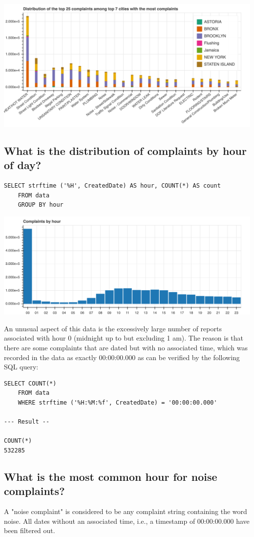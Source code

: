 \documentclass[12pt,a4paper]{article}
\begin{document}
\includegraphics[scale=0.3]{topcomplaintsfortop7cities}

\subsection{What is the distribution of complaints by hour of day?}
\begin{verbatim}
SELECT strftime ('%H', CreatedDate) AS hour, COUNT(*) AS count
    FROM data
    GROUP BY hour
\end{verbatim}

\includegraphics[scale=0.3]{complaintsbyhour}


An unusual aspect of this data is the excessively large number of reports associated with hour 0 (midnight up to but excluding 1 am). The reason is that there are some complaints that are dated but with no associated time, which was recorded in the data as exactly 00:00:00.000 as can be verified by the following SQL query:

\begin{verbatim}
SELECT COUNT(*)
    FROM data
    WHERE strftime ('%H:%M:%f', CreatedDate) = '00:00:00.000'

--- Result --

COUNT(*)
532285
\end{verbatim}


\subsection{What is the most common hour for noise complaints?}
A "noise complaint" is considered to be any complaint string containing the word noise. All dates without an associated time, i.e., a timestamp of 00:00:00.000 have been filtered out.
\end{document}
